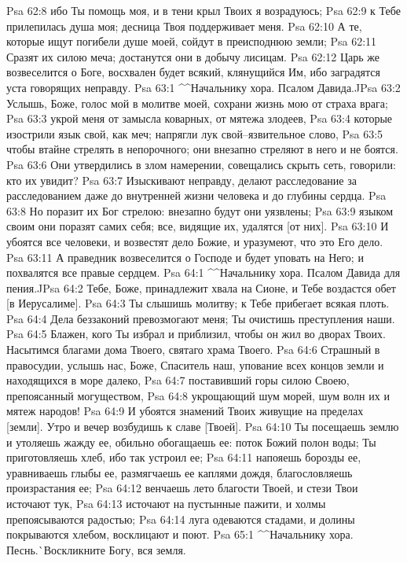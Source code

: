 Psa 62:8  ибо Ты помощь моя, и в тени крыл Твоих я возрадуюсь;
Psa 62:9  к Тебе прилепилась душа моя; десница Твоя поддерживает меня.
Psa 62:10  А те, которые ищут погибели душе моей, сойдут в преисподнюю земли;
Psa 62:11  Сразят их силою меча; достанутся они в добычу лисицам.
Psa 62:12  Царь же возвеселится о Боге, восхвален будет всякий, клянущийся Им, ибо заградятся уста говорящих неправду.
Psa 63:1  ^^Начальнику хора. Псалом Давида.^^
Psa 63:2  Услышь, Боже, голос мой в молитве моей, сохрани жизнь мою от страха врага;
Psa 63:3  укрой меня от замысла коварных, от мятежа злодеев,
Psa 63:4  которые изострили язык свой, как меч; напрягли лук свой--язвительное слово,
Psa 63:5  чтобы втайне стрелять в непорочного; они внезапно стреляют в него и не боятся.
Psa 63:6  Они утвердились в злом намерении, совещались скрыть сеть, говорили: кто их увидит?
Psa 63:7  Изыскивают неправду, делают расследование за расследованием даже до внутренней жизни человека и до глубины сердца.
Psa 63:8  Но поразит их Бог стрелою: внезапно будут они уязвлены;
Psa 63:9  языком своим они поразят самих себя; все, видящие их, удалятся [от них].
Psa 63:10  И убоятся все человеки, и возвестят дело Божие, и уразумеют, что это Его дело.
Psa 63:11  А праведник возвеселится о Господе и будет уповать на Него; и похвалятся все правые сердцем.
Psa 64:1  ^^Начальнику хора. Псалом Давида для пения.^^
Psa 64:2  Тебе, Боже, принадлежит хвала на Сионе, и Тебе воздастся обет [в Иерусалиме].
Psa 64:3  Ты слышишь молитву; к Тебе прибегает всякая плоть.
Psa 64:4  Дела беззаконий превозмогают меня; Ты очистишь преступления наши.
Psa 64:5  Блажен, кого Ты избрал и приблизил, чтобы он жил во дворах Твоих. Насытимся благами дома Твоего, святаго храма Твоего.
Psa 64:6  Страшный в правосудии, услышь нас, Боже, Спаситель наш, упование всех концов земли и находящихся в море далеко,
Psa 64:7  поставивший горы силою Своею, препоясанный могуществом,
Psa 64:8  укрощающий шум морей, шум волн их и мятеж народов!
Psa 64:9  И убоятся знамений Твоих живущие на пределах [земли]. Утро и вечер возбудишь к славе [Твоей].
Psa 64:10  Ты посещаешь землю и утоляешь жажду ее, обильно обогащаешь ее: поток Божий полон воды; Ты приготовляешь хлеб, ибо так устроил ее;
Psa 64:11  напояешь борозды ее, уравниваешь глыбы ее, размягчаешь ее каплями дождя, благословляешь произрастания ее;
Psa 64:12  венчаешь лето благости Твоей, и стези Твои источают тук,
Psa 64:13  источают на пустынные пажити, и холмы препоясываются радостью;
Psa 64:14  луга одеваются стадами, и долины покрываются хлебом, восклицают и поют.
Psa 65:1  ^^Начальнику хора. Песнь.^^ Воскликните Богу, вся земля.
